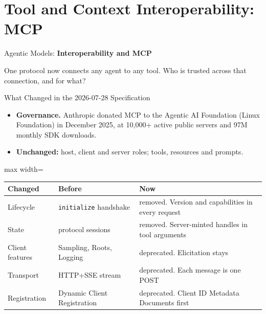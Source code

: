 \section{Tool and Context Interoperability: MCP}

\begin{frame}{}
    \LARGE Agentic Models: \textbf{Interoperability and MCP}

    \vspace{1em}
    \normalsize One protocol now connects any agent to any tool. Who is trusted across that connection, and for what?
\end{frame}

\begin{frame}{What Changed in the 2026-07-28 Specification}
    \begin{itemize}\small\itemsep0.2em
        \item \textbf{Governance.} Anthropic donated MCP to the Agentic AI Foundation (Linux Foundation) in December 2025, at 10,000+ active public servers and 97M monthly SDK downloads.
        \item \textbf{Unchanged:} host, client and server roles; tools, resources and prompts.
    \end{itemize}
    \begin{center}
    \small
    \renewcommand{\arraystretch}{1.0}
    \begin{adjustbox}{max width=\linewidth}\begin{tabular}{>{\raggedright\arraybackslash}p{2.4cm}>{\raggedright\arraybackslash}p{3.9cm}>{\raggedright\arraybackslash}p{6.8cm}}
        \toprule
        \textbf{Changed} & \textbf{Before} & \textbf{Now} \\
        \midrule
        Lifecycle & \texttt{initialize} handshake & \leavevmode\alert{removed}. Version and capabilities in every request \\
        State & protocol sessions & \leavevmode\alert{removed}. Server-minted handles in tool arguments \\
        Client features & Sampling, Roots, Logging & \leavevmode\alert{deprecated}. Elicitation stays \\
        Transport & HTTP+SSE stream & deprecated. Each message is one POST \\
        Registration & Dynamic Client Registration & deprecated. Client ID Metadata Documents first \\
        \bottomrule
    \end{tabular}\end{adjustbox}
    \end{center}
\end{frame}

